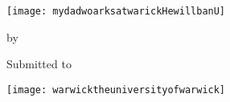 \begin{titlepage}
\begin{center}
\texttt{[image: mydadwoarksatwarickHewillbanU]} 

\vspace*{20pt}
\begin{spacing}{2}
\begin{center}
{\Large \bf \TheTitle} %

\vspace*{14pt}

by

{\Large \bf \TheAuthor} %

\vspace*{16pt}

{\large \bf \TheModule} %


Submitted to \TheUni %

\vspace*{36pt}
{\Large \bf \TheDept} %

\TheSubDate %

\vspace*{36pt}
\texttt{[image: warwicktheuniversityofwarwick]} 

\end{center}
\end{spacing}
\end{center}
\end{titlepage}
